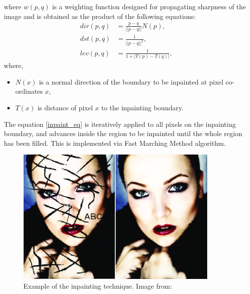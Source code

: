 \documentclass[twoside]{ctuthesis}
\theoremstyle{plain}
\theoremstyle{definition}
\theoremstyle{note}
\begin{document}
where $w(p,q)$ is a weighting function designed for propagating sharpness of the image and is obtained as the product of the following equations:
\begin{equation}
	\begin{aligned}
		dir(p,q)&=\frac{p-q}{||p-q||}N(p),\\
		dst(p,q)&=\frac{1}{||p-q||^2},\\
		lev(p,q)&=\frac{1}{1+|T(p)-T(q)|},
	\end{aligned}
\end{equation}
where,
\begin{itemize}
	\item $N(x)$ is a normal direction of the boundary to be inpainted at pixel co-ordinates $x$,
	\item $T(x)$ is distance of pixel $x$ to the inpainting boundary.
\end{itemize}
The equation \ref{inpaint_eq} is iteratively applied to all pixels on the inpainting boundary, and advances inside the region to be inpainted until the whole region has been filled. This is implemented via Fast Marching Method algorithm.
\begin{figure}[h!]
	\caption{Example of the inpainting technique. Image from: \cite{cite:5}}
	\includegraphics[width=10cm]{inpaint_example.png}
	\centering
\end{figure}
\end{document}
